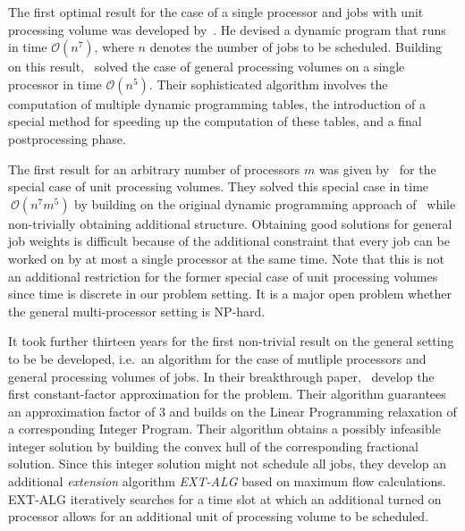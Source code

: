 \documentclass[a4paper]{article}
\begin{document}
The first optimal result for the case of a single processor and jobs with unit processing volume was developed by~\cite{baptiste_unit_jobs}.
He devised a dynamic program that runs in time $\mathcal{O}(n^7)$, where $n$ denotes the number of jobs to be scheduled.
Building on this result,~\cite{baptiste_general_jobs} solved the case of general processing volumes on a single processor in time $\mathcal{O}(n^5)$.
Their sophisticated algorithm involves the computation of multiple dynamic programming tables, the introduction of a special method for speeding up the computation of these tables, and a final postprocessing phase.

The first result for an arbitrary number of processors $m$ was given by~\cite{demaine} for the special case of unit processing volumes.
They solved this special case in time $~\mathcal{O}(n^7m^5)$ by building on the original dynamic programming approach of~\cite{baptiste_unit_jobs} while non-trivially obtaining additional structure.
Obtaining good solutions for general job weights is difficult because of the additional constraint that every job can be worked on by at most a single processor at the same time.
Note that this is not an additional restriction for the former special case of unit processing volumes since time is discrete in our problem setting.
It is a major open problem whether the general multi-processor setting is NP-hard.

It took further thirteen years for the first non-trivial result on the general setting to be be developed, i.e.\ an algorithm for the case of mutliple processors and general processing volumes of jobs.
In their breakthrough paper,~\cite{antoniadis} develop the first constant-factor approximation for the problem.
Their algorithm guarantees an approximation factor of $3$ and builds on the Linear Programming relaxation of a corresponding Integer Program.
Their algorithm obtains a possibly infeasible integer solution by building the convex hull of the corresponding fractional solution.
Since this integer solution might not schedule all jobs, they develop an additional \textit{extension} algorithm \textit{EXT-ALG} based on maximum flow calculations.
EXT-ALG iteratively searches for a time slot at which an additional turned on processor allows for an additional unit of processing volume to be scheduled.
\end{document}
